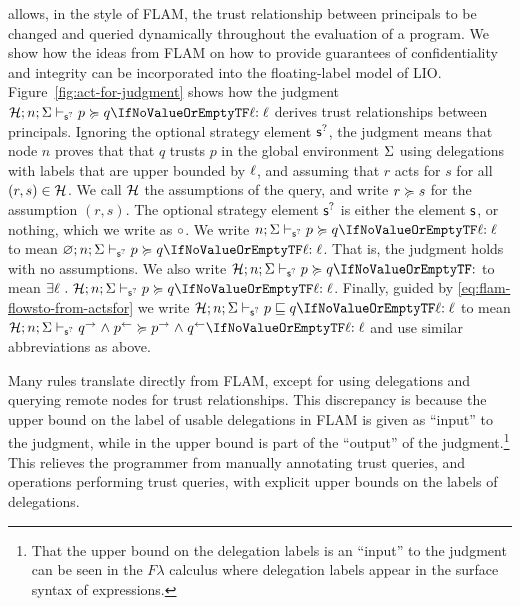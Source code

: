 \lang{} allows, in the style of FLAM, the trust relationship between principals to be changed and queried dynamically throughout the evaluation of a program. We show how the ideas from FLAM on how to provide guarantees of confidentiality and integrity can be incorporated into the floating-label model of LIO. Figure~\ref{fig:act-for-judgment} shows how the judgment $\actsforquery{\Assumps; n; \env}[\option{\stratelem}]{p}{q}{\level}$ derives trust relationships between principals. Ignoring the optional strategy element $\option{\stratelem}$, the judgment means that node $n$ proves that that $q$ trusts $p$ in the global environment $\Sigma$ using delegations with labels that are upper bounded by $\ell$, and assuming that $r$ acts for $s$ for all $(r, s) \in \mathcal{H}$. We call $\mathcal{H}$ the assumptions of the query, and write $r \succcurlyeq s$ for the assumption $(r, s)$. The optional strategy element $\option{\stratelem}$ is either the element $\stratelem$, or nothing, which we write as $\circ$. We write $\actsforquery{n; \env}[\option{\stratelem}]{p}{q}{\level}$ to mean $\actsforquery{\varnothing; n; \env}[\option{\stratelem}]{p}{q}{\level}$. That is, the judgment holds with no assumptions. We also write $\actsforquery{\Assumps; n; \env}[\option{\stratelem}]{p}{q}{}$ to mean $\exists \level~.~\actsforquery{\Assumps; n; \env}[\option{\stratelem}]{p}{q}{\level}$. Finally, guided by \eqref{eq:flam-flowsto-from-actsfor} we write $\flowstoquery{\Assumps; n; \env}[\option{\stratelem}]{p}{q}{\level}$ to mean $\actsforquery{\Assumps; n; \env}[\option{\stratelem}]{\conf{q} \conj \integ{p}}{\conf{p} \conj \integ{q}}{\level}$ and use similar abbreviations as above.

Many rules translate directly from FLAM, except for using delegations and querying remote nodes for trust relationships. This discrepancy is because the upper bound on the label of usable delegations in FLAM is given as ``input'' to the judgment, while in \lang{} the upper bound is part of the ``output'' of the judgment.\footnote{That the upper bound on the delegation labels is an ``input'' to the judgment can be seen in the $F\lambda$ calculus \cite{flamtr} where delegation labels appear in the surface syntax of expressions.} This relieves the programmer from manually annotating trust queries, and operations performing trust queries, with explicit upper bounds on the labels of delegations.

